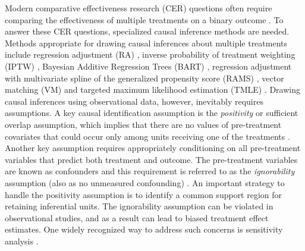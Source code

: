 Modern comparative effectiveness research (CER) questions often require comparing the effectiveness of multiple treatments on a binary outcome \citep{hu2020estimation}. To answer these CER questions, specialized causal inference methods are needed. Methods appropriate for drawing causal inferences about multiple treatments include regression adjustment (RA) \citep{rubin1973use,  linden2016estimating}, inverse probability of treatment weighting (IPTW) \citep{feng2012generalized,mccaffrey2013tutorial}, Bayesian Additive Regression Trees (BART) \citep{hill2011bayesian,hu2021variable, hu2020estimation}, regression adjustment with multivariate spline of the generalized propensity score (RAMS) \citep{hu2021estimation}, vector matching (VM) \citep{lopez2017estimation} and targeted maximum likelihood estimation (TMLE) \citep{rose2019double}.  Drawing causal inferences using observational data, however, inevitably requires assumptions. A key causal identification assumption is the \emph{positivity} or sufficient overlap assumption,  which implies that there are no values of pre-treatment covariates that could occur only among units receiving one of the treatments \citep{hu2020estimation}. Another key assumption requires appropriately conditioning on all pre-treatment variables that predict both treatment and outcome. The pre-treatment variables are known as confounders and this requirement is referred to as the \emph{ignorability} assumption (also as no unmeasured confounding) \citep{hu2022flexible}. An important strategy to handle the positivity assumption is to identify a common support region for retaining inferential units. The ignorability assumption can be violated in observational studies, and as a result can lead to biased treatment effect estimates. One widely recognized way to address such concerns is sensitivity analysis \citep{erik2007strengthening,hu2022flexible}. 


